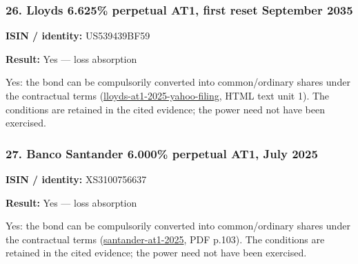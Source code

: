 \documentclass[
  11pt,
]{article}
\begin{document}
\begin{minipage}{\linewidth}

\hypertarget{lloyds-6.625-perpetual-at1-first-reset-september-2035}{%
\subsubsection{26. Lloyds 6.625\% perpetual AT1, first reset September
2035}\label{lloyds-6.625-perpetual-at1-first-reset-september-2035}}

\textbf{ISIN / identity:} US539439BF59

\textbf{Result:} Yes --- loss absorption

Yes: the bond can be compulsorily converted into common/ordinary shares
under the contractual terms
(\href{https://cdn.yahoofinance.com/prod/sec-filings/0001160106/000095010325013729/dp236397_424b2.htm}{lloyds-at1-2025-yahoo-filing},
HTML text unit 1). The conditions are retained in the cited evidence;
the power need not have been exercised.

\end{minipage}
\par\addvspace{1.1em}

\begin{minipage}{\linewidth}

\hypertarget{banco-santander-6.000-perpetual-at1-july-2025}{%
\subsubsection{27. Banco Santander 6.000\% perpetual AT1, July
2025}\label{banco-santander-6.000-perpetual-at1-july-2025}}

\textbf{ISIN / identity:} XS3100756637

\textbf{Result:} Yes --- loss absorption

Yes: the bond can be compulsorily converted into common/ordinary shares
under the contractual terms
(\href{https://www.santander.com/content/dam/santander-com/en/documentos/emisiones/documentos/em-XS3100756637-at1-july-2025-perpnc6-en.pdf}{santander-at1-2025},
PDF p.103). The conditions are retained in the cited evidence; the power
need not have been exercised.

\end{minipage}
\par\addvspace{1.1em}
\end{document}
